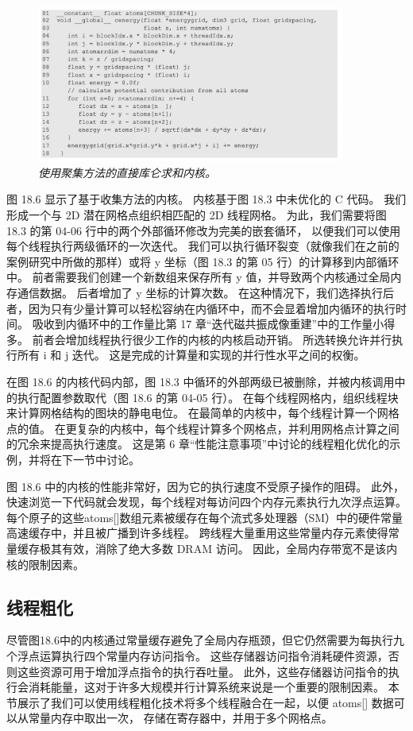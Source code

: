 \begin{figure}[H]
	\centering
	\includegraphics[width=0.9\textwidth]{figs/F18.6.png}
	\caption{\textit{使用聚集方法的直接库仑求和内核。}}
\end{figure}

图 18.6 显示了基于收集方法的内核。 内核基于图 18.3 中未优化的 C 代码。 
我们形成一个与 2D 潜在网格点组织相匹配的 2D 线程网格。 
为此，我们需要将图 18.3 的第 04-06 行中的两个外部循环修改为完美的嵌套循环，
以便我们可以使用每个线程执行两级循环的一次迭代。 
我们可以执行循环裂变（就像我们在之前的案例研究中所做的那样）或将 y 坐标（图 18.3 的第 05 行）的计算移到内部循环中。 
前者需要我们创建一个新数组来保存所有 y 值，并导致两个内核通过全局内存通信数据。 后者增加了 y 坐标的计算次数。 
在这种情况下，我们选择执行后者，因为只有少量计算可以轻松容纳在内循环中，而不会显着增加内循环的执行时间。 
吸收到内循环中的工作量比第 17 章“迭代磁共振成像重建”中的工作量小得多。 前者会增加线程执行很少工作的内核的内核启动开销。 
所选转换允许并行执行所有 i 和 j 迭代。 这是完成的计算量和实现的并行性水平之间的权衡。

在图 18.6 的内核代码内部，图 18.3 中循环的外部两级已被删除，并被内核调用中的执行配置参数取代（图 18.6 的第 04-05 行）。 
在每个线程网格内，组织线程块来计算网格结构的图块的静电电位。 在最简单的内核中，每个线程计算一个网格点的值。 
在更复杂的内核中，每个线程计算多个网格点，并利用网格点计算之间的冗余来提高执行速度。 
这是第 6 章“性能注意事项”中讨论的线程粗化优化的示例，并将在下一节中讨论。

图 18.6 中的内核的性能非常好，因为它的执行速度不受原子操作的阻碍。 
此外，快速浏览一下代码就会发现，每个线程对每访问四个内存元素执行九次浮点运算。 
每个原子的这些atoms[]数组元素被缓存在每个流式多处理器（SM）中的硬件常量高速缓存中，并且被广播到许多线程。 
跨线程大量重用这些常量内存元素使得常量缓存极其有效，消除了绝大多数 DRAM 访问。 
因此，全局内存带宽不是该内核的限制因素。

\subsection{线程粗化}
尽管图18.6中的内核通过常量缓存避免了全局内存瓶颈，但它仍然需要为每执行九个浮点运算执行四个常量内存访问指令。 
这些存储器访问指令消耗硬件资源，否则这些资源可用于增加浮点指令的执行吞吐量。 
此外，这些存储器访问指令的执行会消耗能量，这对于许多大规模并行计算系统来说是一个重要的限制因素。 
本节展示了我们可以使用线程粗化技术将多个线程融合在一起，以便 atoms[] 数据可以从常量内存中取出一次，
存储在寄存器中，并用于多个网格点。

